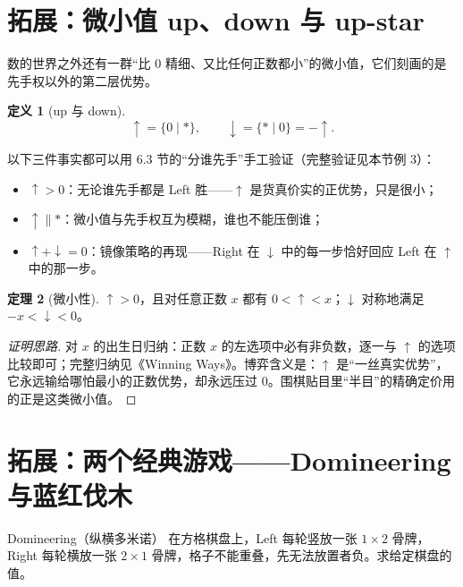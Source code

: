\documentclass[UTF8,a4paper,11pt,oneside,openany,fontset=fandol]{ctexbook}
\theoremstyle{definition}
\newtheorem{definition}{定义}[chapter]
\newtheorem{theorem}[definition]{定理}
\begin{document}
\section{拓展：微小值 up、down 与 up-star}
数的世界之外还有一群“比 $0$ 精细、又比任何正数都小”的微小值，它们刻画的是先手权以外的第二层优势。

\begin{definition}[up 与 down]
\[
 \uparrow=\{0\mid \ast\},\qquad \downarrow=\{\ast\mid 0\}=-\uparrow .
\]
\end{definition}

以下三件事实都可以用 6.3 节的“分谁先手”手工验证（完整验证见本节例 3）：
\begin{itemize}
\item $\uparrow>0$：无论谁先手都是 Left 胜——$\uparrow$ 是货真价实的正优势，只是很小；
\item $\uparrow\parallel\ast$：微小值与先手权互为模糊，谁也不能压倒谁；
\item $\uparrow+\downarrow=0$：镜像策略的再现——Right 在 $\downarrow$ 中的每一步恰好回应 Left 在 $\uparrow$ 中的那一步。
\end{itemize}

\begin{theorem}[微小性]\label{thm:up}
$\uparrow>0$，且对任意正数 $x$ 都有 $0<\uparrow<x$；$\downarrow$ 对称地满足 $-x<\downarrow<0$。
\end{theorem}
\begin{proof}[证明思路]
对 $x$ 的出生日归纳：正数 $x$ 的左选项中必有非负数，逐一与 $\uparrow$ 的选项比较即可；完整归纳见《Winning Ways》。博弈含义是：$\uparrow$ 是“一丝真实优势”，它永远输给哪怕最小的正数优势，却永远压过 $0$。围棋贴目里“半目”的精确定价用的正是这类微小值。
\end{proof}

\section{拓展：两个经典游戏——Domineering 与蓝红伐木}
\begin{problem}{Domineering（纵横多米诺）}
在方格棋盘上，Left 每轮竖放一张 $1\times 2$ 骨牌，Right 每轮横放一张 $2\times 1$ 骨牌，格子不能重叠，先无法放置者负。求给定棋盘的值。
\end{problem}
\end{document}

